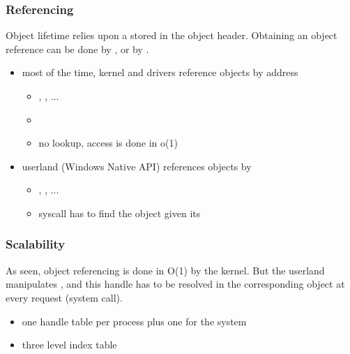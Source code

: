
\begin{frame}
  \frametitle{Referencing}

  Object lifetime relies upon a  stored in the object header.
  Obtaining an object reference can be done by ,  or by
  .

  \begin{itemize}
    \item
      most of the time, kernel and drivers reference objects by address

      \begin{itemize}
        \item
          , , ...
        \item
        \item
          no lookup, access is done in o(1)
      \end{itemize}

    \item
      userland (Windows Native API) references objects by 
      \begin{itemize}
        \item
          , ,  ...
        \item
          syscall has to find the object given its 
      \end{itemize}
  \end{itemize}

\end{frame}



\begin{frame}
  \frametitle{Scalability}

  As seen, object referencing is done in O(1) by the kernel. But the
  userland manipulates , and this handle has to be resolved in
  the corresponding object at every request (system call).

  \begin{itemize}
    \item
       one handle table per process plus one for the system
    \item
      three level index table
  \end{itemize}
\end{frame}

